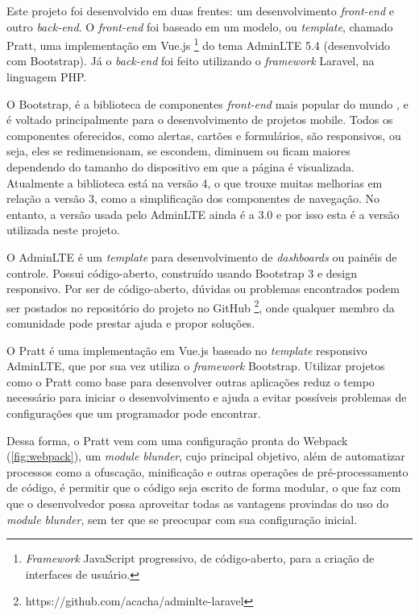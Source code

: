 \newpage
Este projeto foi desenvolvido em duas frentes: um desenvolvimento \textit{front-end} e outro \textit{back-end}. O \textit{front-end} foi baseado em um modelo, ou \textit{template}, chamado Pratt, uma implementação em Vue.js
\footnote{\textit{Framework} JavaScript progressivo, de código-aberto, para a criação de interfaces de usuário.} do tema AdminLTE 5.4 (desenvolvido com Bootstrap). Já o \textit{back-end} foi feito utilizando o \textit{framework} Laravel, na linguagem PHP.

O Bootstrap, é a biblioteca de componentes \textit{front-end} mais popular do mundo \cite{bootstrap}, e é voltado principalmente para o desenvolvimento de projetos mobile. Todos os componentes oferecidos, como alertas, cartões e formulários, são responsivos, ou seja, eles se redimensionam, se escondem, diminuem ou ficam maiores dependendo do tamanho do dispositivo em que a página é visualizada. Atualmente a biblioteca está na versão 4, o que trouxe muitas melhorias em relação a versão 3, como a simplificação dos componentes de navegação. No entanto, a versão usada pelo AdminLTE ainda é a 3.0 e por isso esta é a versão utilizada neste projeto.

O AdminLTE é um \textit{template} para desenvolvimento de \textit{dashboards} ou painéis de controle. Possui código-aberto, construído usando Bootstrap 3 e design responsivo. Por ser de código-aberto, dúvidas ou problemas encontrados podem ser postados no repositório do projeto no GitHub
\footnote{https://github.com/acacha/adminlte-laravel}, onde qualquer membro da comunidade pode prestar ajuda e propor soluções.

O Pratt é uma implementação em Vue.js baseado no \textit{template} responsivo AdminLTE, que por sua vez utiliza o \textit{framework} Bootstrap. Utilizar projetos como o Pratt como base para desenvolver outras aplicações reduz o tempo necessário para iniciar o desenvolvimento e ajuda a evitar possíveis problemas de configurações que um programador pode encontrar. 

Dessa forma, o Pratt vem com uma configuração pronta do Webpack (\autoref{fig:webpack}), um \textit{module blunder}, cujo principal objetivo, além de automatizar processos como a ofuscação, minificação e outras operações de pré-processamento de código, é permitir que o código seja escrito de forma modular, o que faz com que o desenvolvedor possa aproveitar todas as vantagens provindas do uso do \textit{module blunder}, sem ter que se preocupar com sua configuração inicial.

